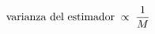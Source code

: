 \documentclass[preview]{standalone}
\begin{document}
\begin{align*}
\special{dvisvgm:raw <g id='unique000'>}\text{varianza del estimador}\;\propto\;\frac{1}{M}\special{dvisvgm:raw </g>}
\end{align*}
\end{document}
